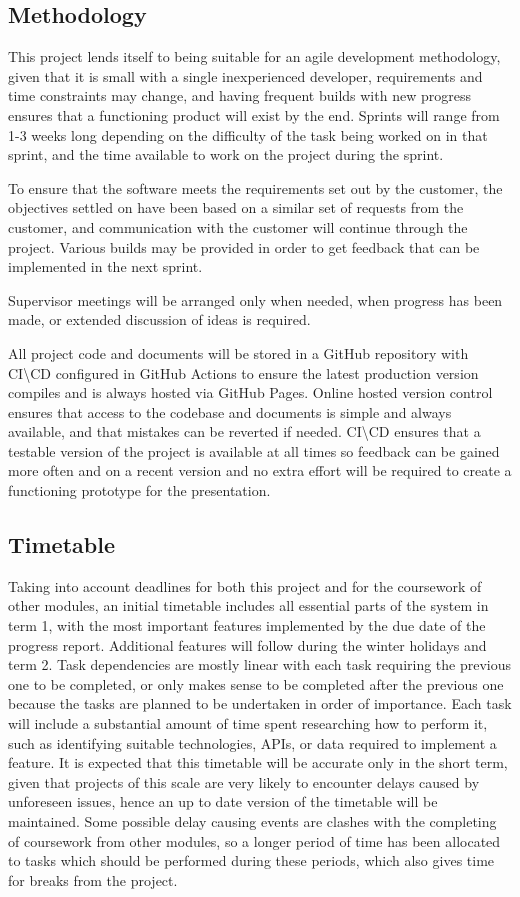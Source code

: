 \subsection{Methodology}
This project lends itself to being suitable for an agile development methodology, given that it is small with a single inexperienced developer, requirements and time constraints may change, and having frequent builds with new progress ensures that a functioning product will exist by the end. Sprints will range from 1-3 weeks long depending on the difficulty of the task being worked on in that sprint, and the time available to work on the project during the sprint. 

To ensure that the software meets the requirements set out by the customer, the objectives settled on have been based on a similar set of requests from the customer, and communication with the customer will continue through the project. Various builds may be provided in order to get feedback that can be implemented in the next sprint.

Supervisor meetings will be arranged only when needed, when progress has been made, or extended discussion of ideas is required.

All project code and documents will be stored in a GitHub repository with CI\textbackslash CD configured in GitHub Actions to ensure the latest production version compiles and is always hosted via GitHub Pages. Online hosted version control ensures that access to the codebase and documents is simple and always available, and that mistakes can be reverted if needed. CI\textbackslash CD ensures that a testable version of the project is available at all times so feedback can be gained more often and on a recent version and no extra effort will be required to create a functioning prototype for the presentation.

\subsection{Timetable}
Taking into account deadlines for both this project and for the coursework of other modules, an initial timetable includes all essential parts of the system in term 1, with the most important features implemented by the due date of the progress report. Additional features will follow during the winter holidays and term 2. Task dependencies are mostly linear with each task requiring the previous one to be completed, or only makes sense to be completed after the previous one because the tasks are planned to be undertaken in order of importance. Each task will include a substantial amount of time spent researching how to perform it, such as identifying suitable technologies, APIs, or data required to implement a feature. It is expected that this timetable will be accurate only in the short term, given that projects of this scale are very likely to encounter delays caused by unforeseen issues, hence an up to date version of the timetable will be maintained. Some possible delay causing events are clashes with the completing of coursework from other modules, so a longer period of time has been allocated to tasks which should be performed during these periods, which also gives time for breaks from the project.

